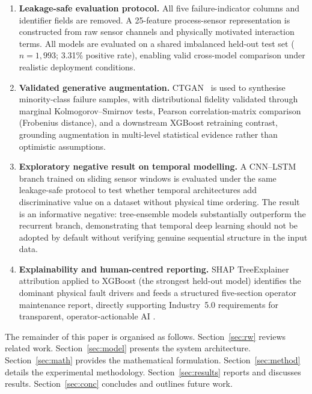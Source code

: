 \documentclass[sensors,article,submit,pdftex,moreauthors]{Definitions/mdpi}
\begin{document}
\begin{enumerate}

\item \textbf{Leakage-safe evaluation protocol.}
All five failure-indicator columns and identifier fields are removed.
A 25-feature process-sensor representation is constructed from raw
sensor channels and physically motivated interaction terms.
All models are evaluated on a shared imbalanced held-out test set
($n = 1{,}993$; 3.31\% positive rate), enabling valid cross-model
comparison under realistic deployment conditions.

\item \textbf{Validated generative augmentation.}
CTGAN~\citep{ref-ctgan-original} is used to synthesise minority-class
failure samples, with distributional fidelity validated through marginal
Kolmogorov--Smirnov tests, Pearson correlation-matrix comparison
(Frobenius distance), and a downstream XGBoost retraining
contrast, grounding augmentation in multi-level statistical evidence
rather than optimistic assumptions.

\item \textbf{Exploratory negative result on temporal modelling.}
A CNN--LSTM branch trained on sliding sensor windows is evaluated
under the same leakage-safe protocol to test whether temporal
architectures add discriminative value on a dataset without physical
time ordering.
The result is an informative negative: tree-ensemble models
substantially outperform the recurrent branch, demonstrating that
temporal deep learning should not be adopted by default without
verifying genuine sequential structure in the input data.

\item \textbf{Explainability and human-centred reporting.}
SHAP TreeExplainer attribution applied to XGBoost (the strongest
held-out model) identifies the dominant physical fault drivers and
feeds a structured five-section operator maintenance report, directly
supporting Industry~5.0 requirements for transparent,
operator-actionable AI
\citep{ref-xai-smart-mfg2025,ref-llm-maintenance2025}.

\end{enumerate}

The remainder of this paper is organised as follows.
Section~\ref{sec:rw} reviews related work.
Section~\ref{sec:model} presents the system architecture.
Section~\ref{sec:math} provides the mathematical formulation.
Section~\ref{sec:method} details the experimental methodology.
Section~\ref{sec:results} reports and discusses results.
Section~\ref{sec:conc} concludes and outlines future work.
\end{document}
